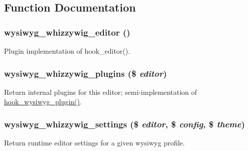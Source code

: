 \subsection{Function Documentation}
\hypertarget{whizzywig_8inc_ab6a3e4d8afc5d0daef2ae850f08d965f}{
\subsubsection[{wysiwyg\_\-whizzywig\_\-editor}]{\setlength{\rightskip}{0pt plus 5cm}wysiwyg\_\-whizzywig\_\-editor ()}}
\label{whizzywig_8inc_ab6a3e4d8afc5d0daef2ae850f08d965f}
Plugin implementation of hook\_\-editor(). \hypertarget{whizzywig_8inc_a64bde943bdb256a00b6b26bb51fe2965}{
\subsubsection[{wysiwyg\_\-whizzywig\_\-plugins}]{\setlength{\rightskip}{0pt plus 5cm}wysiwyg\_\-whizzywig\_\-plugins (\$ {\em editor})}}
\label{whizzywig_8inc_a64bde943bdb256a00b6b26bb51fe2965}
Return internal plugins for this editor; semi-\/implementation of \hyperlink{wysiwyg_8api_8php_abad2b35b32be0b20d73006b73205045c}{hook\_\-wysiwyg\_\-plugin()}. \hypertarget{whizzywig_8inc_a362242dd00c80df7688e7923bcc42ab9}{
\subsubsection[{wysiwyg\_\-whizzywig\_\-settings}]{\setlength{\rightskip}{0pt plus 5cm}wysiwyg\_\-whizzywig\_\-settings (\$ {\em editor}, \/  \$ {\em config}, \/  \$ {\em theme})}}
\label{whizzywig_8inc_a362242dd00c80df7688e7923bcc42ab9}
Return runtime editor settings for a given wysiwyg profile.


